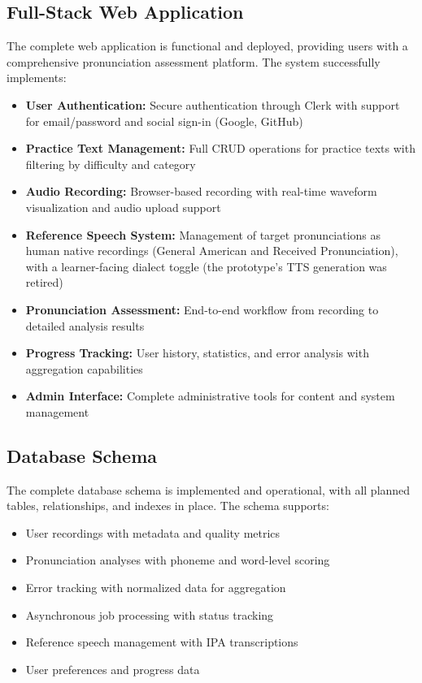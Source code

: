 \documentclass[a4paper,12pt]{report}
\begin{document}
\subsection{Full-Stack Web Application}

The complete web application is functional and deployed, providing users with a comprehensive pronunciation assessment platform. The system successfully implements:

\begin{itemize}
    \item \textbf{User Authentication:} Secure authentication through Clerk with support for email/password and social sign-in (Google, GitHub)
    \item \textbf{Practice Text Management:} Full CRUD operations for practice texts with filtering by difficulty and category
    \item \textbf{Audio Recording:} Browser-based recording with real-time waveform visualization and audio upload support
    \item \textbf{Reference Speech System:} Management of target pronunciations as human native recordings (General American and Received Pronunciation), with a learner-facing dialect toggle (the prototype's TTS generation was retired)
    \item \textbf{Pronunciation Assessment:} End-to-end workflow from recording to detailed analysis results
    \item \textbf{Progress Tracking:} User history, statistics, and error analysis with aggregation capabilities
    \item \textbf{Admin Interface:} Complete administrative tools for content and system management
\end{itemize}

\subsection{Database Schema}

The complete database schema is implemented and operational, with all planned tables, relationships, and indexes in place. The schema supports:
\begin{itemize}
    \item User recordings with metadata and quality metrics
    \item Pronunciation analyses with phoneme and word-level scoring
    \item Error tracking with normalized data for aggregation
    \item Asynchronous job processing with status tracking
    \item Reference speech management with IPA transcriptions
    \item User preferences and progress data
\end{itemize}
\end{document}
